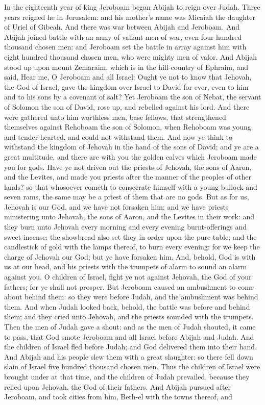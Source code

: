 In the eighteenth year of king Jeroboam began Abijah to reign over Judah. Three years reigned he in Jerusalem: and his mother’s name was Micaiah the daughter of Uriel of Gibeah. And there was war between Abijah and Jeroboam. And Abijah joined battle with an army of valiant men of war, even four hundred thousand chosen men: and Jeroboam set the battle in array against him with eight hundred thousand chosen men, who were mighty men of valor. And Abijah stood up upon mount Zemaraim, which is in the hill-country of Ephraim, and said, Hear me, O Jeroboam and all Israel: Ought ye not to know that Jehovah, the God of Israel, gave the kingdom over Israel to David for ever, even to him and to his sons by a covenant of salt? Yet Jeroboam the son of Nebat, the servant of Solomon the son of David, rose up, and rebelled against his lord. And there were gathered unto him worthless men, base fellows, that strengthened themselves against Rehoboam the son of Solomon, when Rehoboam was young and tender-hearted, and could not withstand them. And now ye think to withstand the kingdom of Jehovah in the hand of the sons of David; and ye are a great multitude, and there are with you the golden calves which Jeroboam made you for gods. Have ye not driven out the priests of Jehovah, the sons of Aaron, and the Levites, and made you priests after the manner of the peoples of other lands? so that whosoever cometh to consecrate himself with a young bullock and seven rams, the same may be a priest of them that are no gods. But as for us, Jehovah is our God, and we have not forsaken him; and we have priests ministering unto Jehovah, the sons of Aaron, and the Levites in their work: and they burn unto Jehovah every morning and every evening burnt-offerings and sweet incense: the showbread also set they in order upon the pure table; and the candlestick of gold with the lamps thereof, to burn every evening: for we keep the charge of Jehovah our God; but ye have forsaken him. And, behold, God is with us at our head, and his priests with the trumpets of alarm to sound an alarm against you. O children of Israel, fight ye not against Jehovah, the God of your fathers; for ye shall not prosper.  But Jeroboam caused an ambushment to come about behind them: so they were before Judah, and the ambushment was behind them. And when Judah looked back, behold, the battle was before and behind them; and they cried unto Jehovah, and the priests sounded with the trumpets. Then the men of Judah gave a shout: and as the men of Judah shouted, it came to pass, that God smote Jeroboam and all Israel before Abijah and Judah. And the children of Israel fled before Judah; and God delivered them into their hand. And Abijah and his people slew them with a great slaughter: so there fell down slain of Israel five hundred thousand chosen men. Thus the children of Israel were brought under at that time, and the children of Judah prevailed, because they relied upon Jehovah, the God of their fathers. And Abijah pursued after Jeroboam, and took cities from him, Beth-el with the towns thereof, and 